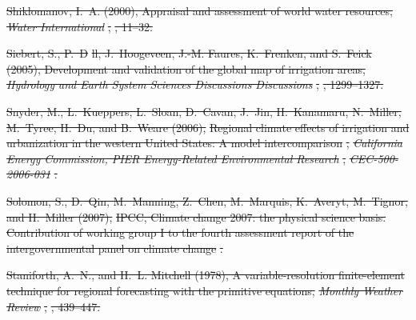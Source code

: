 \documentclass[draft,ms]{agutex}   %
\providecommand{\DIFdel}[1]{{\protect\color{red}\sout{#1}}}                      %
\begin{document}
\begin{article}
\DIFdel{Shiklomanov, I.~A. (2000), Appraisal and assessment of world water resources,
  }\textit{\DIFdel{Water International}}%
\DIFdel{, }%
\DIFdel{, 11--32.
}%

\DIFdel{Siebert, S., P.~D}%
\DIFdel{ll, J.~Hoogeveen, J.-M. Faures, K.~Frenken, and S.~Feick
  (2005), Development and validation of the global map of irrigation areas,
  }\textit{\DIFdel{Hydrology and Earth System Sciences Discussions Discussions}}%
\DIFdel{,
  }%
\DIFdel{, 1299--1327.
}%

\DIFdel{Snyder, M., L.~Kueppers, L.~Sloan, D.~Cavan, J.~Jin, H.~Kanamaru, N.~Miller,
  M.~Tyree, H.~Du, and B.~Weare (2006), }%
\DIFdel{Regional climate effects of irrigation
  and urbanization in the western United States: A model intercomparison}%
\DIFdel{,
  }\textit{\DIFdel{California Energy Commission, PIER Energy-Related Environmental
  Research}}%
\DIFdel{, }\textit{\DIFdel{CEC-500-2006-031}}%
\DIFdel{.
}%

\DIFdel{Solomon, S., D.~Qin, M.~Manning, Z.~Chen, M.~Marquis, K.~Averyt, M.~Tignor, and
  H.~Miller (2007), }%
\DIFdel{IPCC, Climate change 2007: the physical science basis.
  Contribution of working group I to the fourth assessment report of the
  intergovernmental panel on climate change}%
\DIFdel{.
}%

\DIFdel{Staniforth, A.~N., and H.~L. Mitchell (1978), A variable-resolution
  finite-element technique for regional forecasting with the primitive
  equations, }\textit{\DIFdel{Monthly Weather Review}}%
\DIFdel{, }%
\DIFdel{, 439--447.
}%


\end{article}
\end{document}
